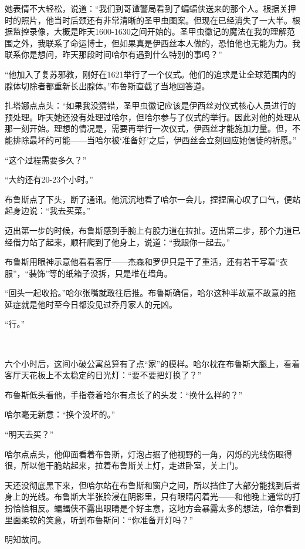 \documentclass[../main]{subfiles}
\begin{document}
她表情不大轻松，说道：“我们到哥谭警局看到了蝙蝠侠送来的那个人。根据关押时的照片，他当时后颈还有非常清晰的圣甲虫图案。但现在已经消失了一大半。根据监控录像，大概是昨天1600-1630之间开始的。圣甲虫徽记的魔法在我的理解范围之外，我联系了命运博士，但如果真是伊西丝本人做的，恐怕他也无能为力。我联系你是想问，昨天那段时间哈尔有遇到什么特别的事吗？”

“他加入了复苏邪教，刚好在1621举行了一个仪式。他们的追求是让全球范围内的腺体切除者都重新长出腺体。”布鲁斯直截了当地回答道。

扎塔娜点点头：“如果我没猜错，圣甲虫徽记应该是伊西丝对仪式核心人员进行的预处理。昨天她还没有处理过哈尔，但哈尔参与了仪式的举行。因此对他的处理从那一刻开始。理想的情况是，需要再举行一次仪式，伊西丝才能施加力量。但，不能排除最坏的可能——当哈尔被‘准备好’之后，伊西丝会立刻回应她信徒的祈愿。”

“这个过程需要多久？”

“大约还有20-23个小时。”

布鲁斯点了下头，断了通讯。他沉沉地看了哈尔一会儿，捏捏眉心叹了口气，便站起身边说：“我去买菜。”

迈出第一步的时候，布鲁斯感到手腕上有股力道在拉扯。迈出第二步，那个力道已经借力站了起来，顺杆爬到了他身上，说道：“我跟你一起去。”

布鲁斯用眼神示意他看看客厅——杰森和罗伊只是干了重活，还有若干写着“衣服”，“装饰”等的纸箱子没拆，只是堆在墙角。

“回头一起收拾。”哈尔张嘴就敢往后推。布鲁斯确信，哈尔这种半故意不故意的拖延症就是他时至今日都没见过乔丹家人的元凶。

“行。”

~\

六个小时后，这间小破公寓总算有了点“家”的模样。哈尔枕在布鲁斯大腿上，看着客厅天花板上不太稳定的日光灯：“要不要把灯换了？”

布鲁斯低头看他，手指卷着哈尔有点长了的头发：“换什么样的？”

哈尔毫无新意：“换个没坏的。”

“明天去买？”

哈尔点点头，他仰面看着布鲁斯，灯泡占据了他视野的一角，闪烁的光线伤眼得很，所以他干脆站起来，拉着布鲁斯关上灯，走进卧室，关上门。

天还没彻底黑下来，但哈尔站在布鲁斯和窗户之间，所以挡住了大部分能找到后者身上的光线。布鲁斯大半张脸浸在阴影里，只有眼睛闪着光——和他晚上通常的打扮恰恰相反。蝙蝠侠不露出眼睛是个好主意，这地方会暴露太多的想法，哈尔看到里面柔软的笑意，听到布鲁斯问：“你准备开灯吗？”

明知故问。
\end{document}
